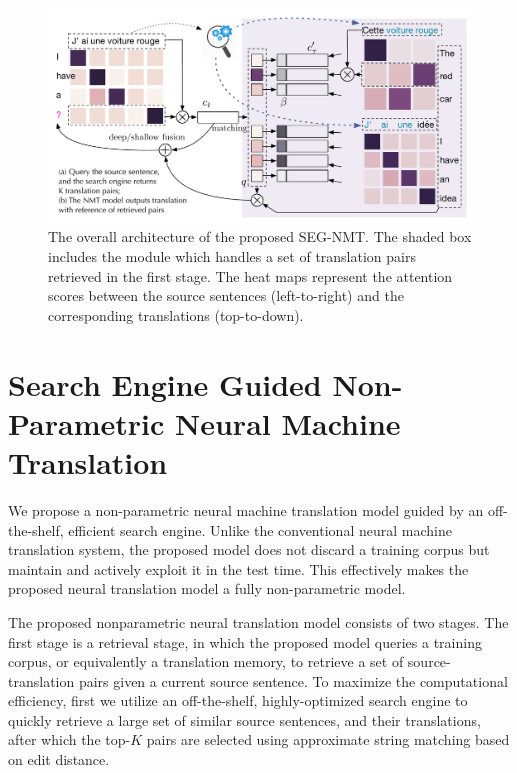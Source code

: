 \begin{figure}[hptb]
\centering
\includegraphics[width=\linewidth]{figs/seg/framework2.pdf}
\caption{\label{cp4.fig.tmnmt} The overall architecture of the proposed SEG-NMT. The shaded box includes the module which handles a set of translation pairs retrieved in the first stage. The heat maps represent the attention scores between the source sentences (left-to-right) and the corresponding translations (top-to-down).}
\end{figure}


\section{Search Engine Guided Non-Parametric Neural Machine Translation}

We propose a non-parametric
neural machine translation model guided by an off-the-shelf, efficient search engine. Unlike the conventional neural machine translation system, the proposed model does not discard a training corpus but maintain and actively exploit it in the test time. This effectively makes the proposed neural translation model a fully non-parametric model.

The proposed nonparametric
neural translation model consists of two stages. The first stage is a retrieval stage, in which the proposed model queries a training corpus, or equivalently a translation memory, to retrieve a set of source-translation pairs given a current source sentence. To maximize the computational efficiency, first we utilize an off-the-shelf, highly-optimized search engine to quickly retrieve a large set of similar source sentences, and their translations, after which the top-$K$ pairs are selected using approximate string matching based on edit distance. 

